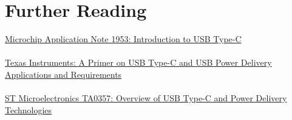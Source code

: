 \documentclass[12pt]{article}
\begin{document}
\newpage

\section{Further Reading}

\href{https://ww1.microchip.com/downloads/en/appnotes/00001953a.pdf}{Microchip Application Note 1953: Introduction to USB Type-C}\\\\
\href{https://www.ti.com/lit/wp/slyy109b/slyy109b.pdf?ts=1696814775662}{Texas Instruments: A Primer on USB Type-C and USB Power Delivery Applications and Requirements}\\\\
\href{https://www.st.com/resource/en/technical_article/dm00496853-overview-of-usb-type-c-and-power-delivery-technologies-stmicroelectronics.pdf}{ST Microelectronics TA0357: Overview of USB Type-C and Power Delivery Technologies}\\\\
\end{document}
